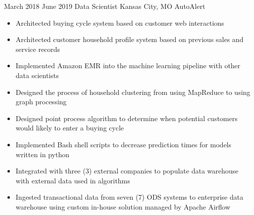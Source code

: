 
\Experience
{March 2018}
{June 2019}
{Data Scientist}
{Kansas City, MO}
{AutoAlert}
{
    \begin{itemize}
        \item Architected buying cycle system based on customer web interactions
        \item Architected customer household profile system based on previous
        sales and service records
        \item Implemented Amazon EMR into the machine learning pipeline with
        other data scientists
        \item Designed the process of household clustering from using MapReduce
        to using graph processing
        \item Designed point process algorithm to determine when potential
        customers would likely to enter a buying cycle
        \item Implemented Bash shell scripts to decrease prediction times for
        models written in python
        \item Integrated with three (3) external companies to populate data
        warehouse with external data used in algorithms
        \item Ingested transactional data from seven (7) ODS systems to
        enterprise data warehouse using custom in-house solution managed by
        Apache Airflow
    \end{itemize}
}


\vspace*{0.05 in}

